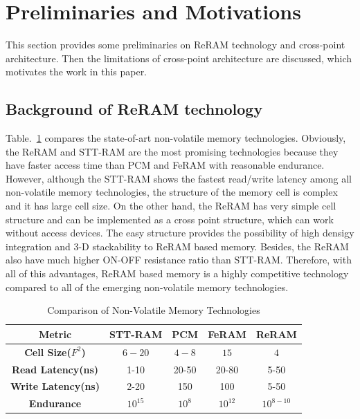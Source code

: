 \vspace{10pt}
\section{Preliminaries and Motivations}

This section provides some preliminaries on ReRAM technology and cross-point architecture. Then the limitations of cross-point architecture are discussed, which motivates the work in this paper.


\subsection{Background of ReRAM technology}
Table.~\ref{table:compare} compares the state-of-art non-volatile memory technologies. Obviously, the ReRAM and STT-RAM are the most promising technologies because they have faster access time than PCM and FeRAM with reasonable endurance. However, although the STT-RAM shows the fastest read/write latency among all non-volatile memory technologies, the structure of the memory cell is complex and it has large cell size. On the other hand, the ReRAM has very simple cell structure and can be implemented as a cross point structure, which can work without access devices. The easy structure provides the possibility of high densigy integration and 3-D stackability to ReRAM based memory. Besides, the ReRAM also have much higher ON-OFF resistance ratio than STT-RAM. Therefore, with all of this advantages, ReRAM based memory is a highly competitive
technology compared to all of the emerging non-volatile memory technologies.

\begin{table}[!b]
  \centering
  \scriptsize
    \scriptsize
  \caption{Comparison of Non-Volatile Memory Technologies}\label{table:compare}
  \vspace{-5pt}
  \begin{tabular}{|c|cccc|}
    \hline
    \textbf{Metric} & \textbf{STT-RAM} & \textbf{PCM}    & \textbf{FeRAM} & \textbf{ReRAM}
    \\\hline
    \textbf{Cell Size($F^2$)} & $6-20$ & $4-8$ & $15$ & $4$\\\hline
    \textbf{Read Latency(ns)} &  1-10 & 20-50 & 20-80 & 5-50\\\hline
    \textbf{Write Latency(ns)} & 2-20& 150& 100& 5-50\\\hline
    \textbf{Endurance} &  $10^{15}$ & $10^8$ & $10^{12}$ & $10^{8-10}$\\\hline
  \end{tabular}
  \vspace{-10pt}
\end{table}


